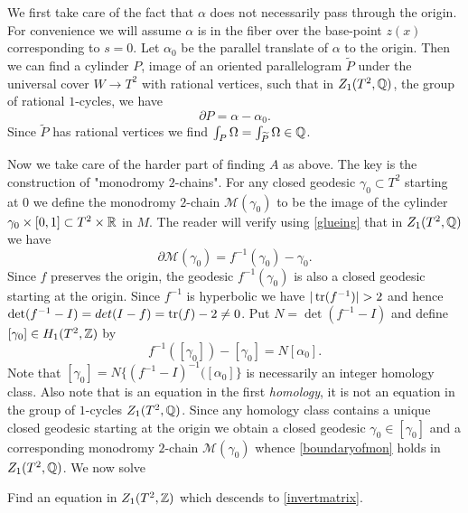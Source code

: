 We first take care of the fact that $\alpha$ does not necessarily pass through the origin. For convenience we will assume $\alpha$ is in the fiber over the base-point $z(x)$ corresponding to $s=0$. Let $\alpha_0$ be the parallel translate of $\alpha$ to the origin. Then we can find a cylinder $P$, image of an oriented parallelogram $\widetilde{P}$ under the universal cover $W \to T^2$ with rational vertices, such that in $Z_1(T^2,\mathbb{Q})$, the group of rational $1$-cycles, we have
\begin{equation}\label{firstrectangle}
\partial P = \alpha - \alpha_0.
\end{equation}
Since $\widetilde{P}$ has rational vertices we find $\int_{P} \Omega = \int_{\widetilde{P}} \Omega \in \mathbb{Q}$.

Now we take care of the harder part of finding $A$ as above. The key is the construction  of "monodromy $2$-chains".  For any closed geodesic $\gamma_0 \subset T^2$ starting at $0$ we define the monodromy $2$-chain  $\mathcal{M}(\gamma_0)$ to be the image of the cylinder $\gamma_0 \times [0,1] \subset T^2 \times \mathbb{R}$ in $M$.
The reader will verify using \eqref{glueing} that in $Z_1(T^2,\mathbb{Q})$ we have 
\begin{equation} \label{boundaryofmon}
 \partial \mathcal{M}(\gamma_0) = f^{-1}(\gamma_0) -\gamma_0.
\end{equation}
Since $f$ preserves the origin, the geodesic $f^{-1}(\gamma_0)$ is also a closed geodesic starting at the origin. Since $f^{-1}$ is hyperbolic we have $|\operatorname{tr}(f^{-1})| >2$ and hence $\det(f^{-1} -I)=  det( I - f) = \operatorname{tr}(f) -2 \neq 0$. Put $N= \det(f^{-1} -I)$ and define $[\gamma_0] \in H_1(T^2,\mathbb{Z})$ by  
\begin{equation}\label{invertmatrix}
f^{-1}([\gamma_0]) -[\gamma_0] = N[\alpha_0]. 
\end{equation}
Note that $[\gamma_0] = N \{(f^{-1} - I)^{-1} ([\alpha_0] \}$ is necessarily an integer homology class. Also note that is an equation in the first {\it homology}, it is not an equation in the group of $1$-cycles $Z_1(T^2,\mathbb{Q})$. Since any homology class contains a unique closed geodesic starting at the origin we obtain a closed geodesic $\gamma_0 \in [\gamma_0]$  and a corresponding  monodromy $2$-chain $\mathcal{M}(\gamma_0)$ whence \eqref{boundaryofmon} holds in $Z_1(T^2,\mathbb{Q})$. We now solve

\begin{problem}
Find an equation in $Z_1(T^2,\mathbb{Z})$ which descends to  \eqref{invertmatrix}. 
\end{problem}
